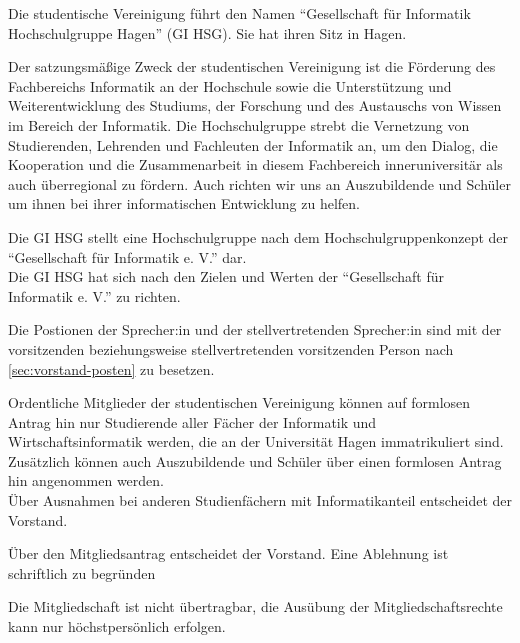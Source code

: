 \pagestyle{fancy}
\begin{contract}
\label{sec:name}

Die studentische Vereinigung führt den Namen ``Gesellschaft für Informatik Hochschulgruppe Hagen'' (GI HSG).  Sie hat ihren Sitz in Hagen.


\label{sec:zweck}

Der satzungsmäßige Zweck der studentischen Vereinigung ist die Förderung des Fachbereichs Informatik an der Hochschule sowie die Unterstützung und Weiterentwicklung des Studiums, der Forschung und des Austauschs von Wissen im Bereich der Informatik. 
Die Hochschulgruppe strebt die Vernetzung von Studierenden, Lehrenden und Fachleuten der Informatik an, um den Dialog, die Kooperation und die Zusammenarbeit in diesem Fachbereich inneruniversitär als auch überregional zu fördern.
Auch richten wir uns an Auszubildende und Schüler um ihnen bei ihrer informatischen Entwicklung zu helfen. 

\label{sec:verhältnisGI}

Die GI HSG stellt eine Hochschulgruppe nach dem Hochschulgruppenkonzept der ``Gesellschaft für Informatik e. V.'' dar. \\
Die GI HSG hat sich nach den Zielen und Werten der ``Gesellschaft für Informatik e. V.'' zu richten.

Die Postionen der Sprecher:in und der stellvertretenden Sprecher:in sind mit der vorsitzenden beziehungsweise stellvertretenden vorsitzenden Person nach \ref{sec:vorstand-posten}{} zu besetzen.


Ordentliche Mitglieder der studentischen Vereinigung können auf formlosen Antrag hin nur Studierende aller Fächer der Informatik und Wirtschaftsinformatik werden, die an der Universität Hagen immatrikuliert sind. Zusätzlich können auch Auszubildende und Schüler über einen formlosen Antrag hin angenommen werden. \\
Über Ausnahmen bei anderen Studienfächern mit Informatikanteil entscheidet der Vorstand.

Über den Mitgliedsantrag entscheidet der Vorstand. Eine Ablehnung ist schriftlich zu begründen

Die Mitgliedschaft ist nicht übertragbar, die Ausübung der Mitgliedschaftsrechte kann nur höchstpersönlich erfolgen. 


\end{contract}
